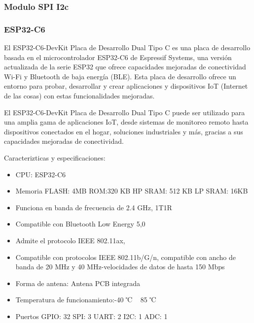     \subsubsection{Modulo SPI I2c}
    
    
    
    \subsubsection{ESP32-C6}
    El ESP32-C6-DevKit Placa de Desarrollo Dual Tipo C es una placa de desarrollo basada en el microcontrolador ESP32-C6 de Espressif Systems, una versión actualizada de la serie ESP32 que ofrece capacidades mejoradas de conectividad Wi-Fi y Bluetooth de baja energía (BLE). Esta placa de desarrollo ofrece un entorno para probar, desarrollar y crear aplicaciones y dispositivos IoT (Internet de las cosas) con estas funcionalidades mejoradas.
    
    El ESP32-C6-DevKit Placa de Desarrollo Dual Tipo C puede ser utilizado para una amplia gama de aplicaciones IoT, desde sistemas de monitoreo remoto hasta dispositivos conectados en el hogar, soluciones industriales y más, gracias a sus capacidades mejoradas de conectividad.
    
    Caracterizticas y especificaciones: 
    \begin{itemize}
        \item CPU: ESP32-C6
    \item Memoria
    FLASH: 4MB
    ROM:320 KB
    HP SRAM: 512 KB
    LP SRAM: 16KB
    \item Funciona en banda de frecuencia de 2.4 GHz, 1T1R
    \item Compatible con Bluetooth Low Energy 5,0
    \item Admite el protocolo IEEE 802.11ax,
    \item Compatible con protocolos IEEE 802.11b/G/n, compatible con ancho de banda de 20 MHz y 40 MHz-velocidades de datos de hasta 150 Mbps
    \item Forma de antena: Antena PCB integrada
    \item Temperatura de funcionamiento:-40 ℃ ~ 85 ℃
    \item Puertos
    GPIO: 32
    SPI: 3
    UART: 2
    I2C: 1
    ADC: 1
    \end{itemize}
    

